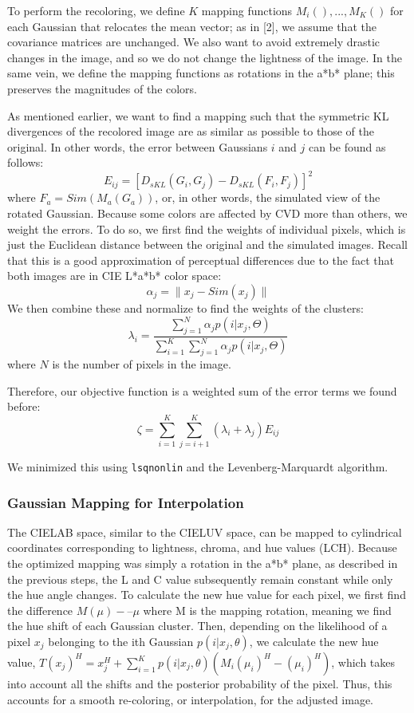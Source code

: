 \documentclass[10pt,twocolumn,letterpaper]{article}
\begin{document}
To perform the recoloring, we define $K$ mapping functions $M_i(), ..., M_K()$ for each Gaussian that relocates the mean vector; as in [2], we assume that the covariance matrices are unchanged. We also want to avoid extremely drastic changes in the image, and so we do not change the lightness of the image. In the same vein, we define the mapping functions as rotations in the a*b* plane; this preserves the magnitudes of the colors. 

As mentioned earlier, we want to find a mapping such that the symmetric KL divergences of the recolored image are as similar as possible to those of the original. In other words, the error between Gaussians $i$ and $j$ can be found as follows: 
\[
  E_{ij} = [D_{sKL}(G_i, G_j) - D_{sKL}(F_i, F_j)]^2
\]
where $F_a = Sim(M_a(G_a))$, or, in other words, the simulated view of the rotated Gaussian. Because some colors are affected by CVD more than others, we weight the errors. To do so, we first find the weights of individual pixels, which is just the Euclidean distance between the original and the simulated images. Recall that this is a good approximation of perceptual differences due to the fact that both images are in CIE L*a*b* color space: 
\[
  \alpha_j = \| x_j - Sim(x_j) \|
\]
We then combine these and normalize to find the weights of the clusters:
\[
  \lambda_i = \frac{\sum_{j=1}^N \alpha_j p(i | x_j, \Theta)}{\sum_{i=1}^K \sum_{j=1}^N \alpha_j p(i | x_j, \Theta)}
\]
where $N$ is the number of pixels in the image. 

Therefore, our objective function is a weighted sum of the error terms we found before:
\[
  \zeta = \sum_{i=1}^K \sum_{j=i+1}^K (\lambda_i + \lambda_j) E_{ij}
\]

We minimized this using \texttt{lsqnonlin} and the Levenberg-Marquardt algorithm. 

\subsubsection{Gaussian Mapping for Interpolation}

The CIELAB space, similar to the CIELUV space, can be mapped to cylindrical coordinates corresponding to lightness, chroma, and hue values (LCH). Because the optimized mapping was simply a rotation in the a*b* plane, as described in the previous steps, the L and C value subsequently remain constant while only the hue angle changes. To calculate the new hue value for each pixel, we first find the difference $M(\mu) -– \mu$ where M is the mapping rotation, meaning we find the hue shift of each Gaussian cluster. Then, depending on the likelihood of a pixel $x_j$ belonging to the ith Gaussian $p(i|x_j, \theta)$, we calculate the new hue value, 
$
T(x_j)^{H} = x_j^{H} + \sum\limits_{i=1}^K p(i|x_j, \theta)(M_i(\mu_i)^{H}-(\mu_i)^{H})
$,
which takes into account all the shifts and the posterior probability of the pixel.  Thus, this accounts for a smooth re-coloring, or interpolation, for the adjusted image. 
\end{document}
